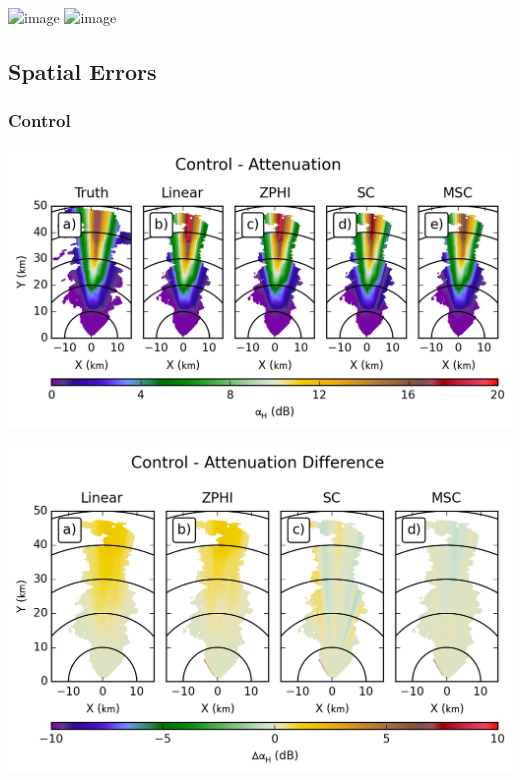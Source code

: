 \documentclass[red]{beamer}
\begin{document}
\begin{frame}
    \begin{center}
        \includegraphics<1>[scale=0.7]{figures/X_Combined_Specific_Attenuation_V_scatter}
        \includegraphics<2>[scale=0.7]{figures/X_Control_Specific_Attenuation_V_scatter}
    \end{center}
\end{frame}

\subsection{Spatial Errors}
\subsubsection{Control}
\begin{frame}
    \begin{center}
        \includegraphics[scale=0.7]{figures/spatial/C_Control_Attenuation_H}
    \end{center}
\end{frame}

\begin{frame}
    \begin{center}
        \includegraphics[scale=0.7]{figures/spatial/C_Control_Attenuation_Difference_H}
    \end{center}
\end{frame}
\end{document}
